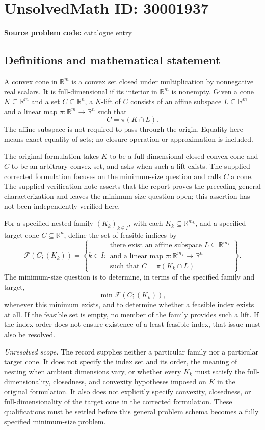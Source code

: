 \documentclass[11pt]{article}
\newcommand{\R}{\mathbb{R}}
\begin{document}
\section*{UnsolvedMath ID: 30001937}
\textbf{Source problem code:} catalogue entry
\subsection{Definitions and mathematical statement}
A convex cone in \(\R^m\) is a convex set closed under multiplication by nonnegative real scalars. It is full-dimensional if its interior in \(\R^m\) is nonempty. Given a cone \(K\subseteq\R^m\) and a set \(C\subseteq\R^n\), a \(K\)-lift of \(C\) consists of an affine subspace \(L\subseteq\R^m\) and a linear map \(\pi:\R^m\to\R^n\) such that
\[
C=\pi(K\cap L).
\]
The affine subspace is not required to pass through the origin. Equality here means exact equality of sets; no closure operation or approximation is included.

The original formulation takes \(K\) to be a full-dimensional closed convex cone and \(C\) to be an arbitrary convex set, and asks when such a lift exists. The supplied corrected formulation focuses on the minimum-size question and calls \(C\) a cone. The supplied verification note asserts that the report proves the preceding general characterization and leaves the minimum-size question open; this assertion has not been independently verified here.

For a specified nested family \((K_k)_{k\in I}\), with each \(K_k\subseteq\R^{m_k}\), and a specified target cone \(C\subseteq\R^n\), define the set of feasible indices by
\[
\mathcal F(C;(K_k))=
\left\{k\in I:\begin{array}{l}
\text{there exist an affine subspace }L\subseteq\R^{m_k}\\
\text{and a linear map }\pi:\R^{m_k}\to\R^n\\
\text{such that }C=\pi(K_k\cap L)
\end{array}\right\}.
\]
The minimum-size question is to determine, in terms of the specified family and target,
\[
\min\mathcal F(C;(K_k)),
\]
whenever this minimum exists, and to determine whether a feasible index exists at all. If the feasible set is empty, no member of the family provides such a lift. If the index order does not ensure existence of a least feasible index, that issue must also be resolved.

\textit{Unresolved scope.} The record supplies neither a particular family nor a particular target cone. It does not specify the index set and its order, the meaning of nesting when ambient dimensions vary, or whether every \(K_k\) must satisfy the full-dimensionality, closedness, and convexity hypotheses imposed on \(K\) in the original formulation. It also does not explicitly specify convexity, closedness, or full-dimensionality of the target cone in the corrected formulation. These qualifications must be settled before this general problem schema becomes a fully specified minimum-size problem.
\end{document}
